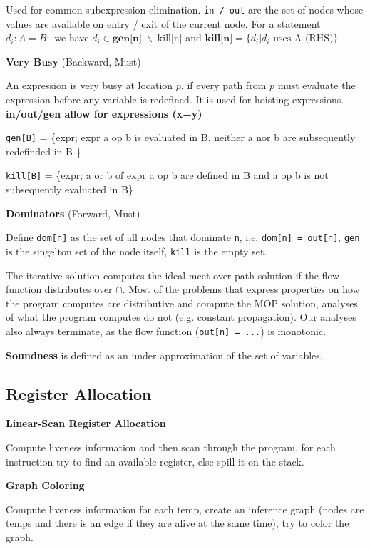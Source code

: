 Used for common subexpression elimination.
\texttt{in / out} are the set of nodes whose values are available on entry / exit of the current node.
For a statement $d_i: A=B:$ we have $d_i \in \textbf{gen[n]} \;\backslash\; \text{kill[n]}$ and $\textbf{kill[n]}=\{d_i | \text{$d_i$ uses A (RHS)}\}$\medskip

\textbf{Very Busy} (Backward, Must)\medskip

An expression is very busy at location $p$, if every path from $p$ must evaluate the expression before any variable is redefined.
It is used for hoisting expressions. \textbf{in/out/gen allow for expressions (x+y)} \medskip

\texttt{gen[B]} = \{expr; expr a op b is evaluated in B, neither a nor b are subsequently redefinded in B \}\smallskip

\texttt{kill[B]} = \{expr; a or b of expr a op b are defined in B and a op b is not subsequently evaluated in B\} \medskip

\textbf{Dominators} (Forward, Must)\medskip

Define \texttt{dom[n]} as the set of all nodes that dominate \texttt{n}, i.e. \texttt{dom[n] = out[n]}, \texttt{gen} is the singelton set of the node itself, \texttt{kill} is the empty set.\medskip

The iterative solution computes the ideal meet-over-path solution if the flow function distributes over $\cap$. Most of the problems that express properties on how the program computes are distributive and compute the MOP solution, analyses of what the program computes do not (e.g. constant propagation). Our analyses also always terminate, as the flow function (\texttt{out[n] = ...}) is monotonic.\medskip

\textbf{Soundness} is defined as an under approximation of the set of variables.


\subsection*{Register Allocation}

\textbf{Linear-Scan Register Allocation}\medskip

Compute liveness information and then scan through the program, for each instruction try to find an available register, else spill it on the stack.\medskip

\textbf{Graph Coloring}\medskip

Compute liveness information for each temp, create an inference graph (nodes are temps and there is an edge if they are alive at the same time), try to color the graph.\medskip

